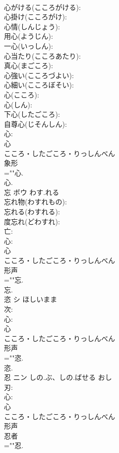 \documentclass[8pt]{extreport}
\begin{document}
\begin{CJK}{UTF8}{min}
\\	心がける(こころがける): 
\\	心掛け(こころがけ): 
\\	心情(しんじょう): 
\\	用心(ようじん): 
\\	一心(いっしん): 
\\	心当たり(こころあたり): 
\\	真心(まごころ): 
\\	心強い(こころづよい): 
\\	心細い(こころぼそい): 
\\	心(こころ): 
\\	心(しん): 
\\	下心(したごころ): 
\\	自尊心(じそんしん): 
\\	心: 
\\	心	
\\	こころ・したごころ・りっしんべん	
\\	象形 
\\	=""心.
\\	心.
\\	忘	ボウ	わす.れる		
\\	忘れ物(わすれもの): 
\\	忘れる(わすれる): 
\\	度忘れ(どわすれ): 
\\	亡: 
\\	心: 
\\	心	
\\	こころ・したごころ・りっしんべん	
\\	形声 
\\	=""忘.
\\	忘.
\\	恣	シ	ほしいまま		
\\	次: 
\\	心: 
\\	心	
\\	こころ・したごころ・りっしんべん	
\\	形声 
\\	=""恣.
\\	恣.
\\	忍	ニン	しの.ぶ、しの.ばせる	おし	
\\	刃: 
\\	心: 
\\	心	
\\	こころ・したごころ・りっしんべん	
\\	形声 
\\	忍者 
\\	=""忍.

\end{CJK}
\end{document}
